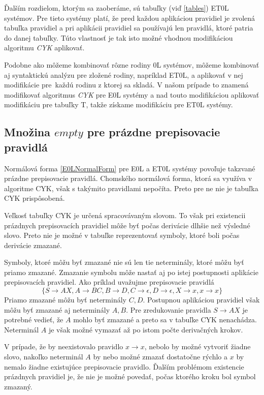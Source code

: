Ďalším rozdielom, ktorým sa zaoberáme, sú tabuľky (viď \ref{tables}) ET0L systémov. Pre tieto systémy platí, že pred každou aplikáciou pravidiel je zvolená tabuľka pravidiel a pri aplikácii pravidiel sa používajú len pravidlá, ktoré patria do danej tabuľky. Túto vlastnosť je tak isto možné vhodnou modifikáciou algoritmu \textit{CYK} aplikovať.

Podobne ako môžeme kombinovať rôzne rodiny 0L systémov, môžeme kombinovať aj syntaktickú analýzu pre zložené rodiny, napríklad ET0L, a aplikovať v nej modifikácie pre~každú rodinu z ktorej sa skladá. V našom prípade to znamená modifikovať algoritmus \textit{CYK} pre E0L systémy a nad touto modifikáciou aplikovať modifikáciu pre tabuľky T, takže získame modifikáciu pre ET0L systémy.

\subsection*{Množina $empty$ pre prázdne prepisovacie pravidlá}
Normálová forma \ref{E0LNormalForm} pre E0L a ET0L systémy povoľuje takzvané prázdne prepisovacie pravidlá. Chomského normálová forma, ktorá sa využíva v algoritme CYK, však s takýmito pravidlami nepočíta. Preto pre ne nie je tabuľka CYK prispôsobená.

Veľkosť tabuľky CYK je určená spracovávaným slovom. To však pri existencii prázdnych prepisovacích pravidiel môže byť počas derivácie dlhšie než výsledné slovo. Preto nie je možné v tabuľke reprezentovať symboly, ktoré boli počas derivácie zmazané.

Symboly, ktoré môžu byť zmazané nie sú len tie neterminály, ktoré môžu byť priamo zmazané. Zmazanie symbolu môže nastať aj po istej postupnosti aplikácie prepisovacích pravidiel. Ako príklad uvažujme prepisovacie pravidlá \[\{S \to AX, A \to BC, B \to D, C \to \epsilon, D \to \epsilon, X \to x, x \to x\}\] Priamo zmazané môžu byť neterminály $C, D$. Postupnou aplikáciou pravidiel však môžu byť zmazané aj neterminály $A, B$. Pre zredukovanie pravidla $S \to AX$ je potrebné vedieť, že $A$ mohlo byť zmazané a preto sa v tabuľke CYK nenachádza. Neterminál $A$ je však možné vymazať až po istom počte derivačných krokov.

V prípade, že by neexistovalo pravidlo $x \to x$, nebolo by možné vytvoriť žiadne slovo, nakoľko neterminál $A$ by nebo možné zmazať dostatočne rýchlo a $x$ by nemalo žiadne existujúce prepisovacie pravidlo. Ďalším problémom existencie prázdnych pravidiel je, že nie je možné povedať, počas ktorého kroku bol symbol zmazaný. 

